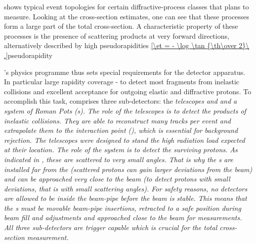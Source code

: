  shows typical event topologies for certain diffractive-process classes that  plans to measure. Looking at the cross-section estimates, one can see that these processes form a large part of the total cross-section. A characteristic property of these processes is the presence of scattering products at very forward directions, alternatively described by high pseudorapidities
\eqref{\et = - \log \tan {\th\over 2}\ .}{pseudorapidity}



's physics programme thus sets special requirements for the detector apparatus. In particular large rapidity coverage - to detect most fragments from inelastic collisions and excellent acceptance for outgoing elastic and diffractive protons. To accomplish this task,  comprises three sub-detectors: the \em{telescopes  and } and a system of \em{Roman Pots} (s). The role of the telescopes is to detect the products of inelastic collisions. They are able to reconstruct many tracks per event and extrapolate them to the interaction point (), which is essential for background rejection. The telescopes were designed to stand the high radiation load expected at their location. The role of the  system is to detect the surviving protons. As indicated in , these are scattered to very small angles. That is why the s are installed far from the  (scattered protons can gain larger deviations from the beam) and can be approached very close to the beam (to detect protons with small deviations, that is with small scattering angles). For safety reasons, no detectors are allowed to be inside the beam-pipe before the beam is stable. This means that the s must be movable beam-pipe insertions, retracted to a safe position during beam fill and adjustments and approached close to the beam for measurements. All three sub-detectors are trigger capable which is crucial for the total cross-section measurement.



